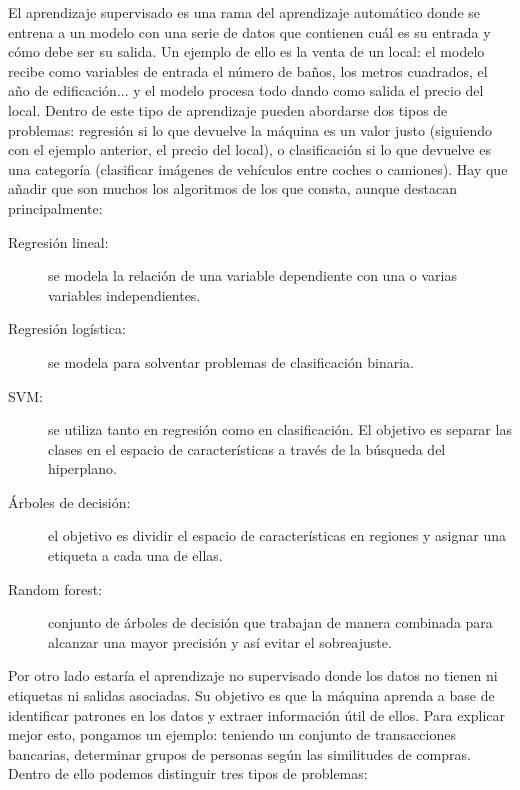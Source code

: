 	El aprendizaje supervisado es una rama del aprendizaje automático donde se entrena a un modelo con una serie de datos que contienen cuál es su entrada y cómo debe ser su salida. Un ejemplo de ello es la venta de un local: el modelo recibe como variables de entrada el número de baños, los metros cuadrados, el año de edificación... y el modelo procesa todo dando como salida el precio del local. Dentro de este tipo de aprendizaje pueden abordarse dos tipos de problemas: regresión si lo que devuelve la máquina es un valor justo (siguiendo con el ejemplo anterior, el precio del local), o clasificación si lo que devuelve es una categoría (clasificar imágenes de vehículos entre coches o camiones). Hay que añadir que son muchos los algoritmos de los que consta, aunque destacan principalmente:
	
	\begin{description}
		\item[Regresión lineal:] se modela la relación de una variable dependiente con una o varias variables independientes.
		\item[Regresión logística:] se modela para solventar problemas de clasificación binaria.
		\item[SVM:] se utiliza tanto en regresión como en clasificación. El objetivo es separar las clases en el espacio de características a través de la búsqueda del hiperplano.
		\item[Árboles de decisión:] el objetivo es dividir el espacio de características en regiones y asignar una etiqueta a cada una de ellas.
		\item[Random forest:] conjunto de árboles de decisión que trabajan de manera combinada para alcanzar una mayor precisión y así evitar el sobreajuste.
	\end{description}

	Por otro lado estaría el aprendizaje no supervisado donde los datos no tienen ni etiquetas ni salidas asociadas. Su objetivo es que la máquina aprenda a base de identificar patrones en los datos y extraer información útil de ellos. Para explicar mejor esto, pongamos un ejemplo: teniendo un conjunto de transacciones bancarias, determinar grupos de personas según las similitudes de compras. Dentro de ello podemos distinguir tres tipos de problemas:
	
